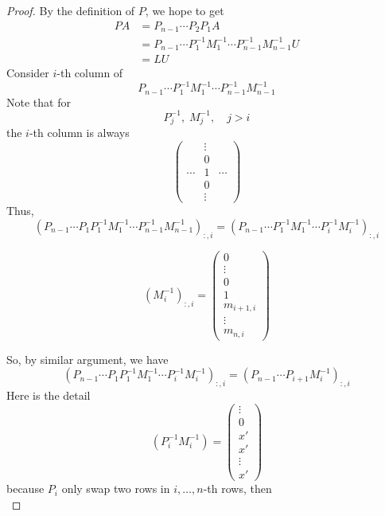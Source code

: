 \begin{proof}
    By the definition of $P$, we hope to get \begin{align*}
        PA &= P_{n-1} \cdots P_2 P_1 A \\[3pt]
        &= P_{n-1} \cdots P_1^{-1} M_1^{-1} \cdots P_{n-1}^{-1} M_{n-1}^{-1} U \\[3pt]
        &= LU
    \end{align*}
    Consider $i$-th column of \[
        P_{n-1} \cdots P_1^{-1} M_1^{-1} \cdots P_{n-1}^{-1} M_{n-1}^{-1}
    \]
    Note that for \[
        P^{-1}_j, \; M^{-1}_j, \quad j > i
    \]
    the $i$-th column is always \[
        \begin{pmatrix}
            & \vdots & \\
            & 0 & \\
            \cdots & 1 & \cdots\\
            & 0 & \\
            & \vdots & 
        \end{pmatrix}
    \]
    Thus, 
    \[
        (P_{n-1} \cdots P_1 P_1^{-1} M_1^{-1} \cdots P_{n-1}^{-1} M_{n-1}^{-1})_{:,i} = (P_{n-1} \cdots P_1^{-1} M_1^{-1} \cdots P_{i}^{-1} M_{i}^{-1})_{:,i}
    \]
    \begin{note}
        \[
            (M_i^{-1})_{:,i} = \begin{pmatrix}
                0 \\
                \vdots \\
                0 \\
                1 \\
                m_{i+1,i} \\
                \vdots \\
                m_{n,i}
            \end{pmatrix}
        \]
    \end{note}
    So, by similar argument, we have \[
        (P_{n-1} \cdots P_1 P_1^{-1} M_1^{-1} \cdots P_{i}^{-1} M_{i}^{-1})_{:,i} = (P_{n-1} \cdots P_{i+1} M_{i}^{-1})_{:,i} \tag{2.1.2}
    \]
    Here is the detail \[
        (P_{i}^{-1} M_{i}^{-1}) = \begin{pmatrix}
            \vdots \\ 0 \\ x' \\ x' \\ \vdots \\ x'
        \end{pmatrix}
    \]
    because $P_i$ only swap two rows in $i, \ldots, n$-th rows, then \[
\]
\end{proof}
